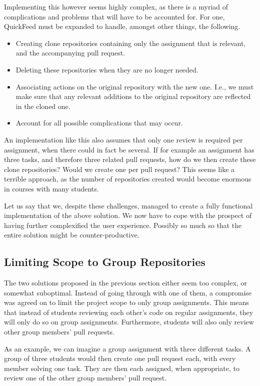 Implementing this however seems highly complex, as there is a myriad of complications and problems that will have to be accounted for.
For one, QuickFeed must be expanded to handle, amongst other things, the following.

\begin{itemize}
    \item Creating clone repositories containing only the assignment that is relevant, and the accompanying pull request.
    \item Deleting these repositories when they are no longer needed.
    \item Associating actions on the original repository with the new one.
    I.e., we must make sure that any relevant additions to the original repository are reflected in the cloned one.
    \item Account for all possible complications that may occur.
\end{itemize}

An implementation like this also assumes that only one review is required per assignment, when there could in fact be several.
If for example an assignment has three tasks, and therefore three related pull requests, how do we then create these clone repositories?
Would we create one per pull request?
This seems like a terrible approach, as the number of repositories created would become enormous in courses with many students.

Let us say that we, despite these challenges, managed to create a fully functional implementation of the above solution.
We now have to cope with the prospect of having further complexified the user experience.
Possibly so much so that the entire solution might be counter-productive.

\subsection{Limiting Scope to Group Repositories}

The two solutions proposed in the previous section either seem too complex, or somewhat suboptimal.
Instead of going through with one of them, a compromise was agreed on to limit the project scope to only group assignments.
This means that instead of students reviewing each other's code on regular assignments, they will only do so on group assignments.
Furthermore, students will also only review other group members' pull requests.

As an example, we can imagine a group assignment with three different tasks.
A group of three students would then create one pull request each, with every member solving one task.
They are then each assigned, when appropriate, to review one of the other group members' pull request.

